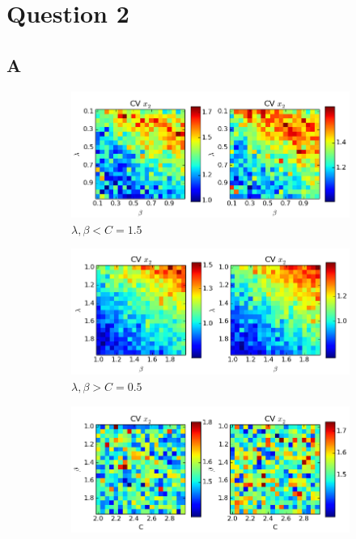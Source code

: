 \documentclass[a4paper,12pt]{article}
\begin{document}
\section*{Question 2}

\subsection*{A}
\begin{figure}[!ht]
        \centering
        \begin{subfigure}[b]{0.49\textwidth}
                \includegraphics[width=\textwidth]{images/vars1}
                \caption{$\lambda, \beta < C=1.5$}
                \label{fig:vars1}
        \end{subfigure}%
        \hfill
        \begin{subfigure}[b]{0.49\textwidth}
                \includegraphics[width=\textwidth]{images/vars2}
                \caption{$\lambda, \beta > C=0.5$}
                \label{fig:vars2}
        \end{subfigure}
          \newline
        \begin{subfigure}[b]{0.496\textwidth}
        \centering
                \includegraphics[width=\textwidth]{images/vars3}

\end{subfigure}
\end{figure}
\end{document}
